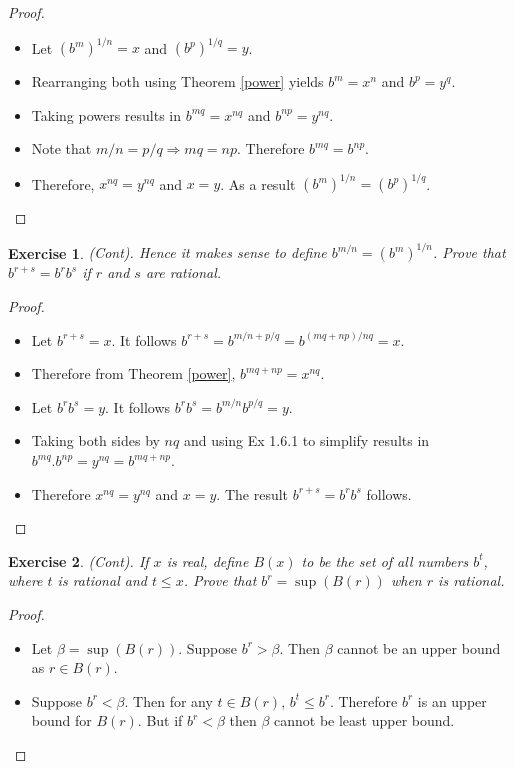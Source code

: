 \documentclass[12pt]{article}
\newtheorem{subexercise}{Exercise}[exercise]
\begin{document}
\begin{proof}
    \begin{itemize}
        \item Let $(b^m)^{1/n} = x$ and $(b^p)^{1/q} = y$.
        \item Rearranging both using Theorem \ref{power} yields $b^m = x^n$ and $b^p = y^q$.
        \item Taking powers results in $b^{mq} = x^{nq}$ and $b^{np} = y^{nq}$.
        \item Note that $m/n = p/q \Rightarrow mq = np$. Therefore $b^{mq} = b^{np}$.
        \item Therefore, $x^{nq} = y^{nq}$ and $x = y$. As a result $(b^m)^{1/n} = (b^p)^{1/q}$.
    \end{itemize}
\end{proof}

\begin{subexercise}
    (Cont). Hence it makes sense to define $b^{m/n} = (b^m)^{1/n}$. Prove that $b^{r+s} = b^r b^s$ if $r$ and $s$ are rational.
\end{subexercise}

\begin{proof}
    \begin{itemize}
        \item Let $b^{r+s} = x$. It follows $b^{r+s} = b^{m/n + p/q} = b^{(mq+np)/nq} = x$.
        \item Therefore from Theorem \ref{power}, $b^{mq+np} = x^{nq}$.
        \item Let $b^r b^s = y$. It follows $b^r b^s = b^{m/n} b^{p/q} = y$.
        \item Taking both sides by $nq$ and using Ex 1.6.1 to simplify results in $b^{mq}.b^{np} = y^{nq} = b^{mq+np}$.
        \item Therefore $x^{nq} = y^{nq}$ and $x = y$. The result $b^{r+s} = b^r b^s$ follows.
    \end{itemize}
\end{proof}

\begin{subexercise}
    (Cont). If $x$ is real, define $B(x)$ to be the set of all numbers $b^t$, where $t$ is rational and $t \leq x$. Prove that $b^r = \sup(B(r))$ when $r$ is rational.
\end{subexercise}

\begin{proof}
    \begin{itemize}
        \item Let $\beta = \sup(B(r))$. Suppose $b^r > \beta$. Then $\beta$ cannot be an upper bound as $r \in B(r)$.
        \item Suppose $b^r < \beta$. Then for any $t \in B(r)$, $b^t \leq b^r$. Therefore $b^r$ is an upper bound for $B(r)$. But if $b^r < \beta$ then $\beta$ cannot be least upper bound.
    \end{itemize}
\end{proof}
\end{document}
